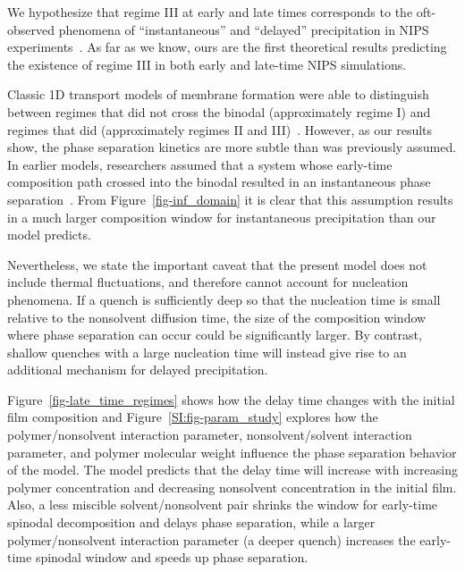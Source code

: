 \documentclass[journal=mamobx, layout=twocolumn]{achemso}
\begin{document}
We hypothesize that regime III at early and late times corresponds to the oft-observed phenomena of ``instantaneous'' and ``delayed'' precipitation in NIPS experiments~\cite{Strathmann1975, vandeWitte1996, Reuvers1987, Reuvers1987a, Tsay1990, McHugh1992, McHugh1995a}. 
As far as we know, ours are the first theoretical results predicting the existence of regime III in both early and late-time NIPS simulations.

Classic 1D transport models of membrane formation were able to distinguish between regimes that did not cross the binodal (approximately regime I) and regimes that did (approximately regimes II and III)~\cite{Reuvers1987a, Tsay1990}.
However, as our results show, the phase separation kinetics are more subtle than was previously assumed.
In earlier models, researchers assumed that a system whose early-time composition path crossed into the binodal resulted in an instantaneous phase separation~\cite{Tsay1990}.
From Figure~\ref{fig-inf_domain} it is clear that this assumption results in a much larger composition window for instantaneous precipitation than our model predicts.

Nevertheless, we state the important caveat that the present model does not include thermal fluctuations, and therefore cannot account for nucleation phenomena.
If a quench is sufficiently deep so that the nucleation time is small relative to the nonsolvent diffusion time, the size of the composition window where phase separation can occur could be significantly larger. 
By contrast, shallow quenches with a large nucleation time will instead give rise to an additional mechanism for delayed precipitation.

Figure~\ref{fig-late_time_regimes} shows how the delay time changes with the initial film composition and Figure~\ref{SI:fig-param_study} explores how the polymer/nonsolvent interaction parameter, nonsolvent/solvent interaction parameter, and polymer molecular weight influence the phase separation behavior of the model.
The model predicts that the delay time will increase with increasing polymer concentration and decreasing nonsolvent concentration in the initial film.
Also, a less miscible solvent/nonsolvent pair shrinks the window for early-time spinodal decomposition and delays phase separation, while a larger polymer/nonsolvent interaction parameter (a deeper quench) increases the early-time spinodal window and speeds up phase separation.
\end{document}
